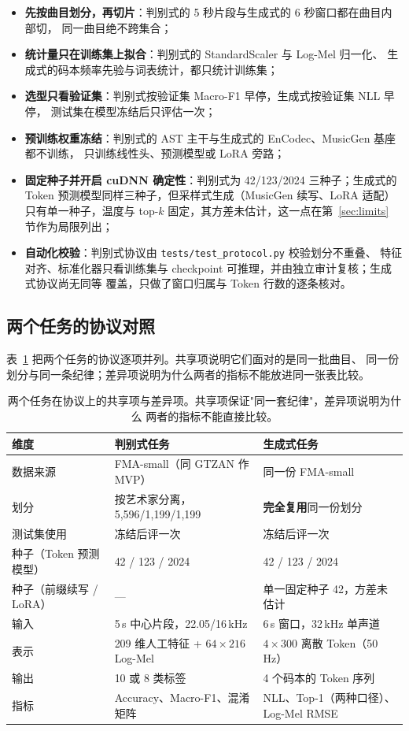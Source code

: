 \documentclass[UTF8,10pt,a4paper]{ctexart}
\begin{document}
\begin{itemize}
  \item \textbf{先按曲目划分，再切片}：判别式的 5 秒片段与生成式的 6 秒窗口都在曲目内部切，
  同一曲目绝不跨集合；
  \item \textbf{统计量只在训练集上拟合}：判别式的 StandardScaler 与 Log-Mel 归一化、
  生成式的码本频率先验与词表统计，都只统计训练集；
  \item \textbf{选型只看验证集}：判别式按验证集 Macro-F1 早停，生成式按验证集 NLL 早停，
  测试集在模型冻结后只评估一次；
  \item \textbf{预训练权重冻结}：判别式的 AST 主干与生成式的 EnCodec、MusicGen 基座都不训练，
  只训练线性头、预测模型或 LoRA 旁路；
  \item \textbf{固定种子并开启 cuDNN 确定性}：判别式为 42/123/2024 三种子；生成式的 Token
  预测模型同样三种子，但采样式生成（MusicGen 续写、LoRA 适配）只有单一种子，温度与 top-$k$
  固定，其方差未估计，这一点在第~\ref{sec:limits} 节作为局限列出；
  \item \textbf{自动化校验}：判别式协议由 \texttt{tests/test\_protocol.py} 校验划分不重叠、
  特征对齐、标准化器只看训练集与 checkpoint 可推理，并由独立审计复核；生成式协议尚无同等
  覆盖，只做了窗口归属与 Token 行数的逐条核对。
\end{itemize}

\subsection{两个任务的协议对照}\label{sec:twotask}

表~\ref{tab:twotask} 把两个任务的协议逐项并列。共享项说明它们面对的是同一批曲目、
同一份划分与同一条纪律；差异项说明为什么两者的指标不能放进同一张表比较。

\begin{table}[H]
\centering\small
\caption{两个任务在协议上的共享项与差异项。共享项保证"同一套纪律"，差异项说明为什么
两者的指标不能直接比较。}
\label{tab:twotask}
\begin{tabular}{lll}
\toprule
维度 & 判别式任务 & 生成式任务 \\
\midrule
数据来源 & FMA-small（同 GTZAN 作 MVP） & 同一份 FMA-small \\
划分 & 按艺术家分离，5{,}596/1{,}199/1{,}199 & \textbf{完全复用}同一份划分 \\
测试集使用 & 冻结后评一次 & 冻结后评一次 \\
种子（Token 预测模型） & 42 / 123 / 2024 & 42 / 123 / 2024 \\
种子（前缀续写 / LoRA） & --- & 单一固定种子 42，方差未估计 \\
\midrule
输入 & 5\,s 中心片段，22.05/16\,kHz & 6\,s 窗口，32\,kHz 单声道 \\
表示 & 209 维人工特征 + $64\times216$ Log-Mel & $4\times300$ 离散 Token（50\,Hz） \\
输出 & 10 或 8 类标签 & 4 个码本的 Token 序列 \\
指标 & Accuracy、Macro-F1、混淆矩阵 & NLL、Top-1（两种口径）、Log-Mel RMSE \\
\bottomrule
\end{tabular}
\end{table}
\end{document}
